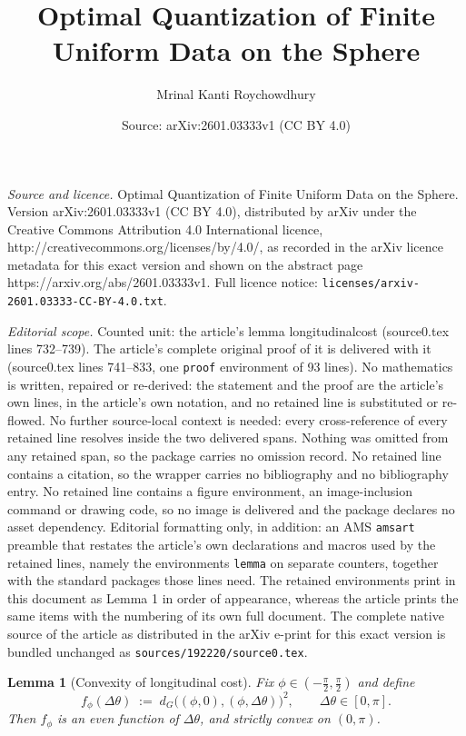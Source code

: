 \documentclass[10pt,a4paper]{amsart}
\title{Optimal Quantization of Finite Uniform Data on the Sphere}
\author{Mrinal Kanti Roychowdhury}
\date{Source: arXiv:2601.03333v1 (CC BY 4.0)}
\newtheorem{lemma}{Lemma}
\begin{document}
\maketitle

\noindent\emph{Source and licence.} Optimal Quantization of Finite Uniform Data on the Sphere. Version arXiv:2601.03333v1 (CC BY 4.0), distributed by arXiv under the Creative Commons Attribution 4.0 International licence, http://creativecommons.org/licenses/by/4.0/, as recorded in the arXiv licence metadata for this exact version and shown on the abstract page https://arxiv.org/abs/2601.03333v1. Full licence notice: \texttt{licenses/arxiv-2601.03333-CC-BY-4.0.txt}.\par\smallskip

\noindent\textit{Editorial scope.} Counted unit: the article's lemma longitudinalcost (source0.tex lines 732--739). The article's complete original proof of it is delivered with it (source0.tex lines 741--833, one \texttt{proof} environment of 93 lines). No mathematics is written, repaired or re-derived: the statement and the proof are the article's own lines, in the article's own notation, and no retained line is substituted or re-flowed.  No further source-local context is needed: every cross-reference of every retained line resolves inside the two delivered spans.  Nothing was omitted from any retained span, so the package carries no omission record.  No retained line contains a citation, so the wrapper carries no bibliography and no bibliography entry.  No retained line contains a figure environment, an image-inclusion command or drawing code, so no image is delivered and the package declares no asset dependency.  Editorial formatting only, in addition: an AMS \texttt{amsart} preamble that restates the article's own declarations and macros used by the retained lines, namely the environments \texttt{lemma} on separate counters, together with the standard packages those lines need.  The retained environments print in this document as Lemma 1 in order of appearance, whereas the article prints the same items with the numbering of its own full document.  The complete native source of the article as distributed in the arXiv e-print for this exact version is bundled unchanged as \texttt{sources/192220/source0.tex}.
\begin{lemma}[Convexity of longitudinal cost] \label{longitudinalcost}
Fix $\phi\in(-\tfrac{\pi}{2},\tfrac{\pi}{2})$ and define
\[
f_\phi(\Delta\theta)\;:=\; d_G\!\big((\phi,0),(\phi,\Delta\theta)\big)^2,
\qquad \Delta\theta\in[0,\pi].
\]
Then $f_\phi$ is an even function of $\Delta\theta$, and strictly convex on $(0,\pi)$.
\end{lemma}
\end{document}

